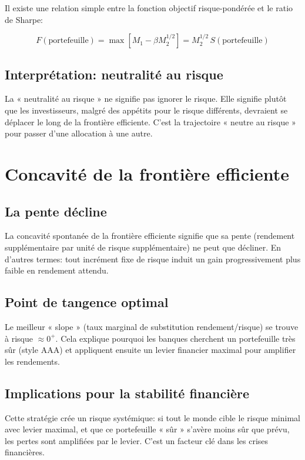 \documentclass[11pt,a4paper]{article}
\begin{document}
Il existe une relation simple entre la fonction objectif risque-pondérée et le ratio de Sharpe:

\[
F(\text{portefeuille}) = \max[M_1 - \beta M_2^{1/2}] = M_2^{1/2} \, S(\text{portefeuille})
\]

\subsection{Interprétation: neutralité au risque}

La « neutralité au risque » ne signifie pas ignorer le risque. Elle signifie plutôt que les investisseurs, malgré des appétits pour le risque différents, devraient se déplacer le long de la frontière efficiente. C'est la trajectoire « neutre au risque » pour passer d'une allocation à une autre.

\section{Concavité de la frontière efficiente}

\subsection{La pente décline}

La concavité spontanée de la frontière efficiente signifie que sa pente (rendement supplémentaire par unité de risque supplémentaire) ne peut que décliner. En d'autres termes: tout incrément fixe de risque induit un gain progressivement plus faible en rendement attendu.

\subsection{Point de tangence optimal}

Le meilleur « slope » (taux marginal de substitution rendement/risque) se trouve à risque $\approx 0^+$. Cela explique pourquoi les banques cherchent un portefeuille très sûr (style AAA) et appliquent ensuite un levier financier maximal pour amplifier les rendements.

\subsection{Implications pour la stabilité financière}

Cette stratégie crée un risque systémique: si tout le monde cible le risque minimal avec levier maximal, et que ce portefeuille « sûr » s'avère moins sûr que prévu, les pertes sont amplifiées par le levier. C'est un facteur clé dans les crises financières.
\end{document}
